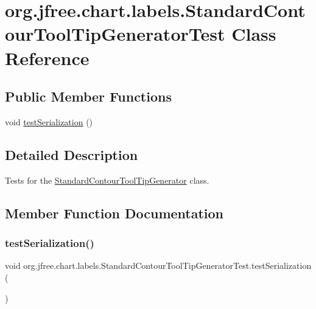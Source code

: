 \hypertarget{classorg_1_1jfree_1_1chart_1_1labels_1_1_standard_contour_tool_tip_generator_test}{}\section{org.\+jfree.\+chart.\+labels.\+Standard\+Contour\+Tool\+Tip\+Generator\+Test Class Reference}
\label{classorg_1_1jfree_1_1chart_1_1labels_1_1_standard_contour_tool_tip_generator_test}
\subsection*{Public Member Functions}
\begin{DoxyCompactItemize}
\item 
void \mbox{\hyperlink{classorg_1_1jfree_1_1chart_1_1labels_1_1_standard_contour_tool_tip_generator_test_a7195aa2d40549838fedff48235118919}{test\+Serialization}} ()
\end{DoxyCompactItemize}


\subsection{Detailed Description}
Tests for the {\ttfamily \mbox{\hyperlink{classorg_1_1jfree_1_1chart_1_1labels_1_1_standard_contour_tool_tip_generator}{Standard\+Contour\+Tool\+Tip\+Generator}}} class. 

\subsection{Member Function Documentation}
\mbox{\label{classorg_1_1jfree_1_1chart_1_1labels_1_1_standard_contour_tool_tip_generator_test_a7195aa2d40549838fedff48235118919}} 
\subsubsection{\texorpdfstring{test\+Serialization()}{testSerialization()}}
{\footnotesize\ttfamily void org.\+jfree.\+chart.\+labels.\+Standard\+Contour\+Tool\+Tip\+Generator\+Test.\+test\+Serialization (\begin{DoxyParamCaption}{ }\end{DoxyParamCaption})}

